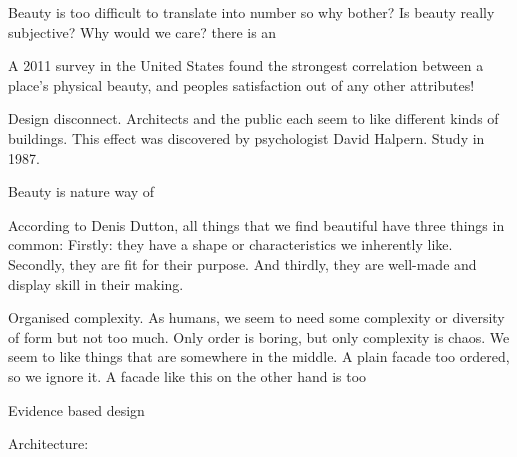 
Beauty is too difficult to translate into number so why bother?
Is beauty really subjective?
Why would we care? there is an

A 2011 survey in the United States found the strongest correlation between a place's physical beauty, and peoples satisfaction out of any other attributes!

Design disconnect. Architects and the public each seem to like different kinds of buildings. This effect was discovered by psychologist David Halpern. Study in 1987.

Beauty is nature way of

According to Denis Dutton, all things that we find beautiful have three things in common: Firstly: they have a shape or characteristics we inherently like.
Secondly, they are fit for their purpose.
And thirdly, they are well-made and display skill in their making.

Organised complexity. As humans, we seem to need some complexity or diversity of form but not too much. Only order is boring, but only complexity is chaos. We seem to like things that are somewhere in the middle. A plain facade too ordered, so we ignore it. A facade like this on the other hand is too

Evidence based design




Architecture:\cite{Aesthetic2022}



